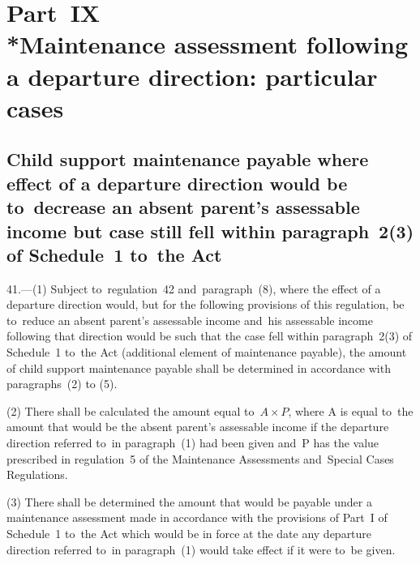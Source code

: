 \documentclass[12pt,a4paper]{article}
\begin{document}

\section[Part~IX --- Maintenance assessment following a departure direction: particular cases]{\sloppy Part~IX\\*Maintenance assessment following a departure direction: particular cases}

\renewcommand\parthead{--- Part~IX}

\subsection[41. Child support maintenance payable where effect of a departure direction
would be to~decrease an absent parent’s assessable income but case still fell
within paragraph~2(3) of Schedule~1 to~the Act]{Child support maintenance payable where effect of a departure direction
would be to~decrease an absent parent’s assessable income but case still fell
within paragraph~2(3) of Schedule~1 to~the Act}

41.—(1) Subject to~regulation~42
and~paragraph~(8), where the effect of a departure direction would, but for the
following provisions of this regulation, be to~reduce an absent parent’s
assessable income and~his assessable income following that direction would be
such that the case fell within paragraph~2(3) of Schedule~1 to~the Act
(additional element of maintenance payable), the amount of child support
maintenance payable shall be determined in accordance with paragraphs~(2) to
(5).

(2) There shall be calculated the amount equal to~\(A \times P\), where A is equal to~the
amount that would be the absent parent’s assessable income if the departure
direction referred to~in paragraph~(1) had been given and~P has the value
prescribed in regulation~5 of the Maintenance Assessments and~Special Cases
Regulations.


(3) There shall be determined the amount that would be payable under a maintenance assessment made in accordance with the provisions of Part~I of Schedule~1 to~the Act which would be in force at the date any departure direction referred to~in paragraph~(1) would take effect if it were to~be given.
\end{document}
